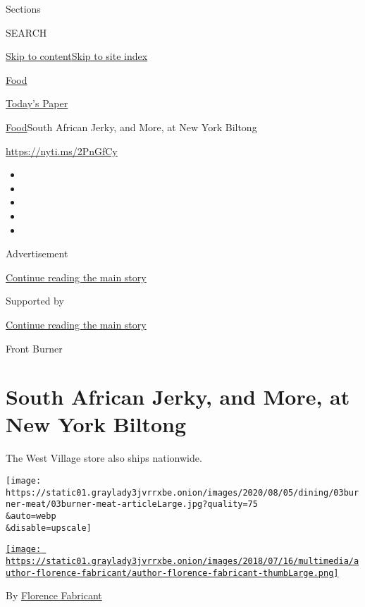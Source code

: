 Sections

SEARCH

\protect\hyperlink{site-content}{Skip to
content}\protect\hyperlink{site-index}{Skip to site index}

\href{https://www.nytimes3xbfgragh.onion/section/food}{Food}

\href{https://myaccount.nytimes3xbfgragh.onion/auth/login?response_type=cookie\&client_id=vi}{}

\href{https://www.nytimes3xbfgragh.onion/section/todayspaper}{Today's
Paper}

\href{/section/food}{Food}\textbar{}South African Jerky, and More, at
New York Biltong

\url{https://nyti.ms/2PnGfCy}

\begin{itemize}
\item
\item
\item
\item
\item
\end{itemize}

Advertisement

\protect\hyperlink{after-top}{Continue reading the main story}

Supported by

\protect\hyperlink{after-sponsor}{Continue reading the main story}

Front Burner

\hypertarget{south-african-jerky-and-more-at-new-york-biltong}{%
\section{South African Jerky, and More, at New York
Biltong}\label{south-african-jerky-and-more-at-new-york-biltong}}

The West Village store also ships nationwide.

\texttt{[image: https://static01.graylady3jvrrxbe.onion/images/2020/08/05/dining/03burner-meat/03burner-meat-articleLarge.jpg?quality=75\\\&auto=webp\\\&disable=upscale]}

\href{https://www.nytimes3xbfgragh.onion/by/florence-fabricant}{\texttt{[image: https://static01.graylady3jvrrxbe.onion/images/2018/07/16/multimedia/author-florence-fabricant/author-florence-fabricant-thumbLarge.png]}}

By
\href{https://www.nytimes3xbfgragh.onion/by/florence-fabricant}{Florence
Fabricant}

